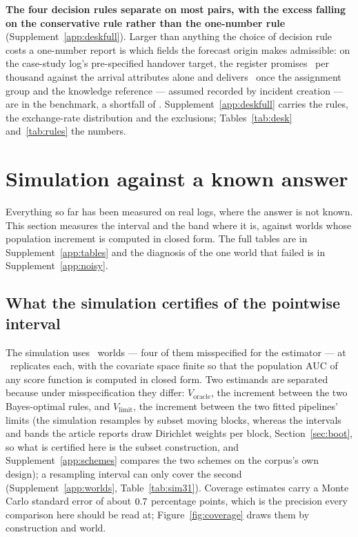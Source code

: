 \documentclass[11pt,3p,review,authoryear]{elsarticle}
\theoremstyle{definition}
\begin{document}
\textbf{The four decision rules separate on most pairs, with the excess
falling on the conservative rule rather than the one-number rule}
(Supplement~\ref{app:deskfull}). Larger than anything the choice of decision
rule costs a one-number report is which fields the forecast origin makes
admissible: on the case-study log's pre-specified handover target, the
register promises \promisedPerThousand\ per thousand against the arrival
attributes alone and delivers \deliveredPerThousand\ once the assignment
group and the knowledge reference --- assumed recorded by incident creation
--- are in the benchmark, a shortfall of \shortfallPerThousand. Supplement~\ref{app:deskfull} carries the rules, the
exchange-rate distribution and the exclusions; Tables~\ref{tab:desk}
and~\ref{tab:rules} the numbers.
\section{Simulation against a known answer}
\label{sec:sim}

Everything so far has been measured on real logs, where the answer is not
known. This section measures the interval and the band where it is, against
worlds whose population increment is computed in closed form. The full tables are in
Supplement~\ref{app:tables} and the diagnosis of the one world that failed is
in Supplement~\ref{app:noisy}.

\subsection{What the simulation certifies of the pointwise interval}
\label{sec:simworlds}
\label{sec:simcoverage}
\label{sec:simsensitivity}

The simulation uses \nWorlds\ worlds --- four of them misspecified for the
estimator --- at \nSimReps\ replicates each, with the covariate space finite
so that the population AUC of any score function is computed in closed form.
Two estimands are separated because under misspecification they differ:
$V_{\mathrm{oracle}}$, the increment between the two Bayes-optimal rules, and
$V_{\mathrm{limit}}$, the increment between the two fitted pipelines' limits
(the simulation resamples by subset moving blocks, whereas the intervals
and bands the article reports draw Dirichlet weights per block,
Section~\ref{sec:boot}, so what is certified here is the subset
construction, and Supplement~\ref{app:schemes} compares the two schemes on
the corpus's own design);
a resampling interval can only cover the second (Supplement~\ref{app:worlds},
Table~\ref{tab:sim31}). Coverage estimates carry a Monte Carlo standard error
of about $0.7$ percentage points, which is the precision every
comparison here should be read at; Figure~\ref{fig:coverage} draws them by
construction and world.
\end{document}
